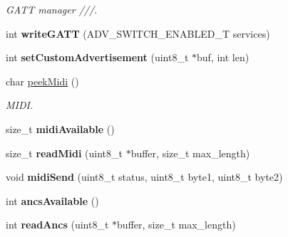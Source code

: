 \begin{DoxyCompactItemize}
\begin{DoxyCompactList}\small\item\em G\+A\+T\+T manager ///. \end{DoxyCompactList}\item 
\hypertarget{class_bean_serial_transport_aaa20fd44ee605355143050587e220311}{}int {\bfseries write\+G\+A\+T\+T} (A\+D\+V\+\_\+\+S\+W\+I\+T\+C\+H\+\_\+\+E\+N\+A\+B\+L\+E\+D\+\_\+\+T services)\label{class_bean_serial_transport_aaa20fd44ee605355143050587e220311}

\item 
\hypertarget{class_bean_serial_transport_a11353ace66d9165f3b3c956d8259aca0}{}int {\bfseries set\+Custom\+Advertisement} (uint8\+\_\+t $\ast$buf, int len)\label{class_bean_serial_transport_a11353ace66d9165f3b3c956d8259aca0}

\item 
\hypertarget{class_bean_serial_transport_a065ed6c8d4ba54d1766befc697c3fc49}{}char \hyperlink{class_bean_serial_transport_a065ed6c8d4ba54d1766befc697c3fc49}{peek\+Midi} ()\label{class_bean_serial_transport_a065ed6c8d4ba54d1766befc697c3fc49}

\begin{DoxyCompactList}\small\item\em M\+I\+D\+I. \end{DoxyCompactList}\item 
\hypertarget{class_bean_serial_transport_a046419bba1864712a456b9c32e7f23da}{}size\+\_\+t {\bfseries midi\+Available} ()\label{class_bean_serial_transport_a046419bba1864712a456b9c32e7f23da}

\item 
\hypertarget{class_bean_serial_transport_ac15a5ed513bd10faac0094e2127d1fe9}{}size\+\_\+t {\bfseries read\+Midi} (uint8\+\_\+t $\ast$buffer, size\+\_\+t max\+\_\+length)\label{class_bean_serial_transport_ac15a5ed513bd10faac0094e2127d1fe9}

\item 
\hypertarget{class_bean_serial_transport_acc483e6104c01be693b4360dbb73626b}{}void {\bfseries midi\+Send} (uint8\+\_\+t status, uint8\+\_\+t byte1, uint8\+\_\+t byte2)\label{class_bean_serial_transport_acc483e6104c01be693b4360dbb73626b}

\item 
\hypertarget{class_bean_serial_transport_a6d3c56740146629918233c0c0c0d330f}{}int {\bfseries ancs\+Available} ()\label{class_bean_serial_transport_a6d3c56740146629918233c0c0c0d330f}

\item 
\hypertarget{class_bean_serial_transport_a61554e7d199d89a0fb9b5ae179e3054a}{}int {\bfseries read\+Ancs} (uint8\+\_\+t $\ast$buffer, size\+\_\+t max\+\_\+length)\label{class_bean_serial_transport_a61554e7d199d89a0fb9b5ae179e3054a}


\end{DoxyCompactItemize}
